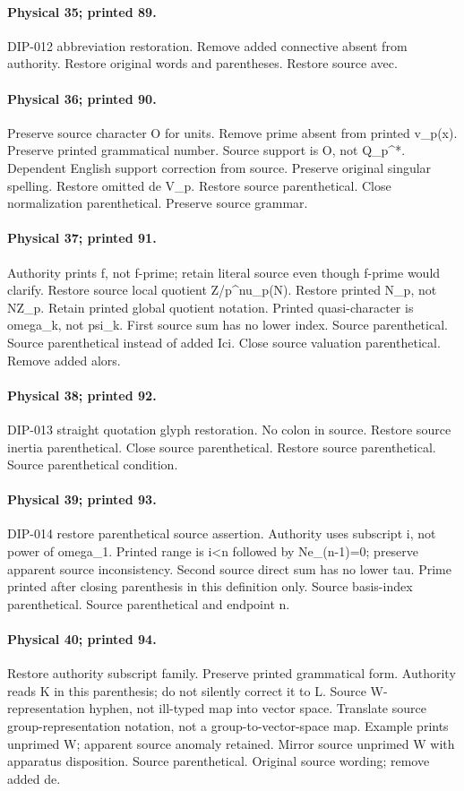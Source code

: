 \documentclass[10pt,a4paper]{article}
\begin{document}
\paragraph{Physical 35; printed 89.} DIP-012 abbreviation restoration. Remove added connective absent from authority. Restore original words and parentheses. Restore source avec.
\paragraph{Physical 36; printed 90.} Preserve source character O for units. Remove prime absent from printed v\_p(x). Preserve printed grammatical number. Source support is O, not Q\_p\textasciicircum{}*. Dependent English support correction from source. Preserve original singular spelling. Restore omitted de V\_p. Restore source parenthetical. Close normalization parenthetical. Preserve source grammar.
\paragraph{Physical 37; printed 91.} Authority prints f, not f-prime; retain literal source even though f-prime would clarify. Restore source local quotient Z/p\textasciicircum{}nu\_p(N). Restore printed N\_p, not NZ\_p. Retain printed global quotient notation. Printed quasi-character is omega\_k, not psi\_k. First source sum has no lower index. Source parenthetical. Source parenthetical instead of added Ici. Close source valuation parenthetical. Remove added alors.
\paragraph{Physical 38; printed 92.} DIP-013 straight quotation glyph restoration. No colon in source. Restore source inertia parenthetical. Close source parenthetical. Restore source parenthetical. Source parenthetical condition.
\paragraph{Physical 39; printed 93.} DIP-014 restore parenthetical source assertion. Authority uses subscript i, not power of omega\_1. Printed range is i<n followed by Ne\_(n-1)=0; preserve apparent source inconsistency. Second source direct sum has no lower tau. Prime printed after closing parenthesis in this definition only. Source basis-index parenthetical. Source parenthetical and endpoint n.
\paragraph{Physical 40; printed 94.} Restore authority subscript family. Preserve printed grammatical form. Authority reads K in this parenthesis; do not silently correct it to L. Source W-representation hyphen, not ill-typed map into vector space. Translate source group-representation notation, not a group-to-vector-space map. Example prints unprimed W; apparent source anomaly retained. Mirror source unprimed W with apparatus disposition. Source parenthetical. Original source wording; remove added de.
\end{document}
